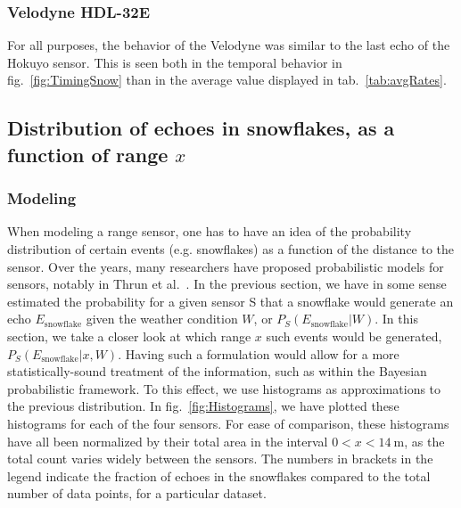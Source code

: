 \subsubsection{Velodyne HDL-32E}
For all purposes, the behavior of the Velodyne was similar to the last echo of the Hokuyo sensor. This is seen both in the temporal behavior in fig.~\ref{fig:TimingSnow} than in the average value displayed in tab.~\ref{tab:avgRates}.

\subsection{Distribution of echoes in snowflakes, as a function of range $x$}
\label{subsub:Histo}

\subsubsection{Modeling}
When modeling a range sensor, one has to have an idea of the probability distribution of certain events (e.g. snowflakes) as a function of the distance to the sensor. Over the years, many researchers have proposed probabilistic models for sensors, notably in Thrun et al.~\cite{Thrun:2005:PR:1121596}. In the previous section, we have in some sense estimated the probability for a given sensor S that a snowflake would generate an echo $E_\text{snowflake}$ given the weather condition $W$, or $P_S(E_\text{snowflake}|W)$. In this section, we take a closer look at which range $x$ such events would be generated, $P_S(E_\text{snowflake}|x,W)$. Having such a formulation would allow for a more statistically-sound treatment of the information, such as within the Bayesian probabilistic framework. To this effect, we use histograms as approximations to the previous distribution. In fig.~\ref{fig:Histograms}, we have plotted these histograms for each of the four sensors. For ease of comparison, these histograms have all been normalized by their total area in the interval $0 < x < \SI{14}{\meter}$, as the total count varies widely between the sensors. The numbers in brackets in the legend indicate the fraction of echoes in the snowflakes compared to the total number of data points, for a particular dataset.


